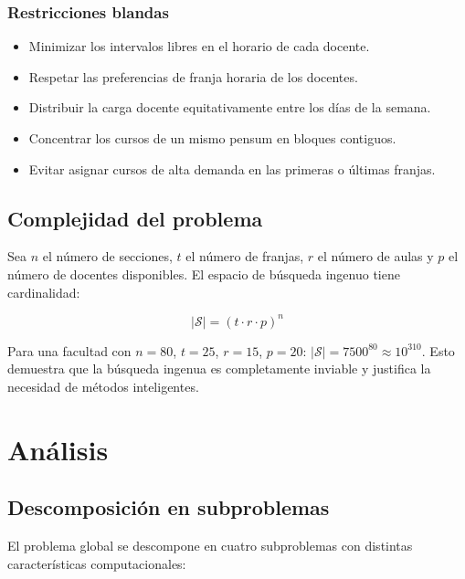 \documentclass[12pt,twoside]{report}
\theoremstyle{definition}
\begin{document}
\subsection{Restricciones blandas}
\begin{itemize}[leftmargin=2em,itemsep=3pt]
  \item Minimizar los intervalos libres en el horario de cada docente.
  \item Respetar las preferencias de franja horaria de los docentes.
  \item Distribuir la carga docente equitativamente entre los d\'ias de la semana.
  \item Concentrar los cursos de un mismo pensum en bloques contiguos.
  \item Evitar asignar cursos de alta demanda en las primeras o \'ultimas franjas.
\end{itemize}

\section{Complejidad del problema}

Sea $n$ el n\'umero de secciones, $t$ el n\'umero de franjas, $r$ el n\'umero de
aulas y $p$ el n\'umero de docentes disponibles.  El espacio de b\'usqueda ingenuo
tiene cardinalidad:

\begin{equation}
  |\mathcal{S}| = (t \cdot r \cdot p)^{n}
  \label{eq:espacio}
\end{equation}

Para una facultad con $n=80$, $t=25$, $r=15$, $p=20$:
$|\mathcal{S}| = 7500^{80} \approx 10^{310}$.
Esto demuestra que la b\'usqueda ingenua es completamente inviable y justifica la
necesidad de m\'etodos inteligentes.

\chapter{Análisis}
\label{ch:analisis}

\section{Descomposici\'on en subproblemas}

El problema global se descompone en cuatro subproblemas con distintas
caracter\'isticas computacionales:
\end{document}
